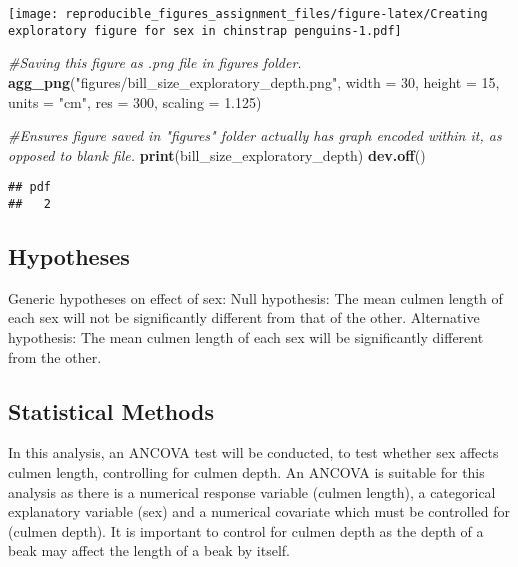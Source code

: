 \documentclass[
]{article}
\newenvironment{Shaded}{\begin{snugshade}}{\end{snugshade}}
\newcommand{\AttributeTok}[1]{\textcolor[rgb]{0.13,0.29,0.53}{#1}}
\newcommand{\CommentTok}[1]{\textcolor[rgb]{0.56,0.35,0.01}{\textit{#1}}}
\newcommand{\DecValTok}[1]{\textcolor[rgb]{0.00,0.00,0.81}{#1}}
\newcommand{\FloatTok}[1]{\textcolor[rgb]{0.00,0.00,0.81}{#1}}
\newcommand{\FunctionTok}[1]{\textcolor[rgb]{0.13,0.29,0.53}{\textbf{#1}}}
\newcommand{\NormalTok}[1]{#1}
\newcommand{\StringTok}[1]{\textcolor[rgb]{0.31,0.60,0.02}{#1}}
\begin{document}
\texttt{[image: reproducible\_figures\_assignment\_files/figure-latex/Creating exploratory figure for sex in chinstrap penguins-1.pdf]}

\begin{Shaded}
\begin{Highlighting}[]
\CommentTok{\#Saving this figure as .png file in figures folder.}
\FunctionTok{agg\_png}\NormalTok{(}\StringTok{"figures/bill\_size\_exploratory\_depth.png"}\NormalTok{, }
        \AttributeTok{width =} \DecValTok{30}\NormalTok{,}
        \AttributeTok{height =} \DecValTok{15}\NormalTok{,}
        \AttributeTok{units =} \StringTok{"cm"}\NormalTok{,}
        \AttributeTok{res =} \DecValTok{300}\NormalTok{,}
        \AttributeTok{scaling =} \FloatTok{1.125}\NormalTok{)}

\CommentTok{\#Ensures figure saved in "figures" folder actually has graph encoded within it, as opposed to blank file.}
\FunctionTok{print}\NormalTok{(bill\_size\_exploratory\_depth)}
\FunctionTok{dev.off}\NormalTok{()}
\end{Highlighting}
\end{Shaded}

\begin{verbatim}
## pdf 
##   2
\end{verbatim}

\subsection{Hypotheses}\label{hypotheses}

Generic hypotheses on effect of sex: Null hypothesis: The mean culmen
length of each sex will not be significantly different from that of the
other. Alternative hypothesis: The mean culmen length of each sex will
be significantly different from the other.

\subsection{Statistical Methods}\label{statistical-methods}

In this analysis, an ANCOVA test will be conducted, to test whether sex
affects culmen length, controlling for culmen depth. An ANCOVA is
suitable for this analysis as there is a numerical response variable
(culmen length), a categorical explanatory variable (sex) and a
numerical covariate which must be controlled for (culmen depth). It is
important to control for culmen depth as the depth of a beak may affect
the length of a beak by itself.
\end{document}
